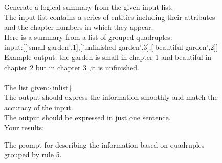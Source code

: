 \begin{figure}[htbp]
\centering
\begin{tcolorbox}
Generate a logical summary from the given input list. \\
The input list contains a series of entities including their attributes and the chapter numbers in which they appear.\\
Here is a summary from a list of grouped quadruples:\\
input:[['small garden',1],['unfinished garden',3],['beautiful garden',2]]\\
Example output: the garden is small in chapter 1 and beautiful in chapter 2 but in chapter 3 ,it is unfinished.\\
\\
The list given:\{inlist\}\\
The output should express the information smoothly and match the accuracy of the input.\\
The output should be expressed in just one sentence.\\
Your results:\\
\end{tcolorbox}
\caption{The prompt for describing the information based on quadruples grouped by rule 5.}
\label{tab:group trans5}
\end{figure}



